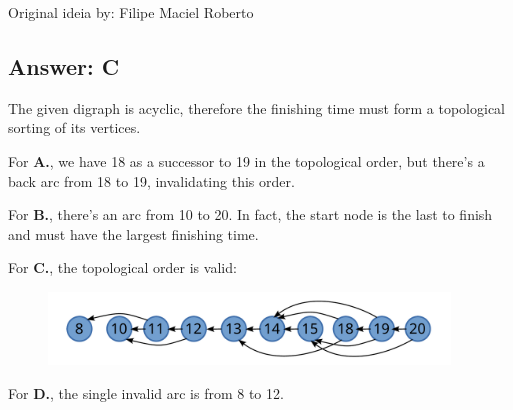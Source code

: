 Original ideia by: Filipe Maciel Roberto


\subsection*{Answer: C}

The given digraph is acyclic, therefore the finishing time must form a topological sorting of its vertices.

For \textbf{A.}, we have 18 as a successor to 19 in the topological order, but there's a back arc from 18 to 19, invalidating this order.

For \textbf{B.}, there's an arc from 10 to 20. In fact, the start node is the last to finish and  must have the largest finishing time.

For \textbf{C.}, the topological order is valid:

\begin{figure}[H]
    \centering
    \includegraphics[width=0.95\textwidth]{images/119.pdf}
\end{figure}

For \textbf{D.}, the single invalid arc is from 8 to 12.
